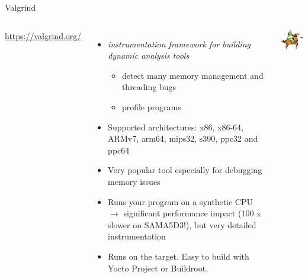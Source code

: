 \begin{frame}{Valgrind}
  \begin{columns}[T]
    \url{https://valgrind.org/}
    \begin{itemize}
    \item {\em instrumentation framework for building dynamic analysis tools}
      \begin{itemize}
      \item detect many memory management and threading bugs
      \item profile programs
      \end{itemize}
    \item Supported architectures: x86, x86-64, ARMv7, arm64, mips32,
      s390, ppc32 and ppc64
    \item Very popular tool especially for debugging memory issues
    \item Runs your program on a synthetic CPU $\rightarrow$
      significant performance impact (100 x slower on SAMA5D3!),
      but very detailed instrumentation
    \item Runs on the target. Easy to build with Yocto Project
	  or Buildroot.
    \end{itemize}
    \includegraphics[width=\textwidth]{common/valgrind1.png}
  \end{columns}
\end{frame}


